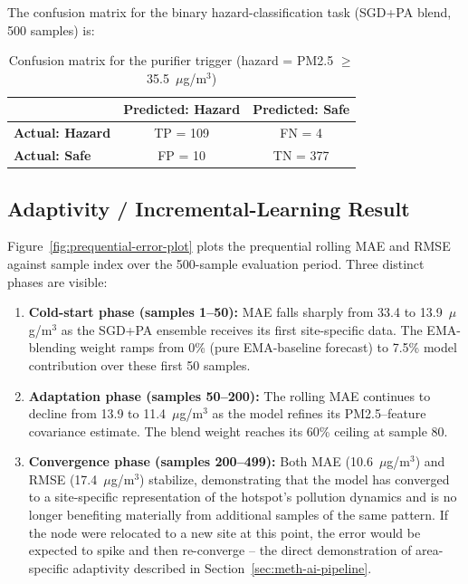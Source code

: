 \noindent The confusion matrix for the binary hazard-classification task (SGD+PA blend, 500 samples) is:

\begin{table}[htbp]
\centering
\caption{Confusion matrix for the purifier trigger (hazard = PM2.5 $\geq$ 35.5~$\mu$g/m$^3$)}
\label{tab:confusion-matrix}
\begin{tabular}{@{}lcc@{}}
\toprule
 & \textbf{Predicted: Hazard} & \textbf{Predicted: Safe} \\
\midrule
\textbf{Actual: Hazard} & TP = 109 & FN = 4 \\
\textbf{Actual: Safe}   & FP = 10  & TN = 377 \\
\bottomrule
\end{tabular}
\end{table}

\subsection{Adaptivity / Incremental-Learning Result}
\label{sec:exp-adaptivity-result}

Figure~\ref{fig:prequential-error-plot} plots the prequential rolling MAE and RMSE against sample index over the 500-sample evaluation period. Three distinct phases are visible:

\begin{enumerate}
    \item \textbf{Cold-start phase (samples 1--50):} MAE falls sharply from 33.4 to 13.9~$\mu$g/m$^3$ as the SGD+PA ensemble receives its first site-specific data. The EMA-blending weight ramps from 0\% (pure EMA-baseline forecast) to 7.5\% model contribution over these first 50 samples.
    \item \textbf{Adaptation phase (samples 50--200):} The rolling MAE continues to decline from 13.9 to 11.4~$\mu$g/m$^3$ as the model refines its PM2.5--feature covariance estimate. The blend weight reaches its 60\% ceiling at sample 80.
    \item \textbf{Convergence phase (samples 200--499):} Both MAE (10.6~$\mu$g/m$^3$) and RMSE (17.4~$\mu$g/m$^3$) stabilize, demonstrating that the model has converged to a site-specific representation of the hotspot's pollution dynamics and is no longer benefiting materially from additional samples of the same pattern. If the node were relocated to a new site at this point, the error would be expected to spike and then re-converge -- the direct demonstration of area-specific adaptivity described in Section~\ref{sec:meth-ai-pipeline}.
\end{enumerate}


